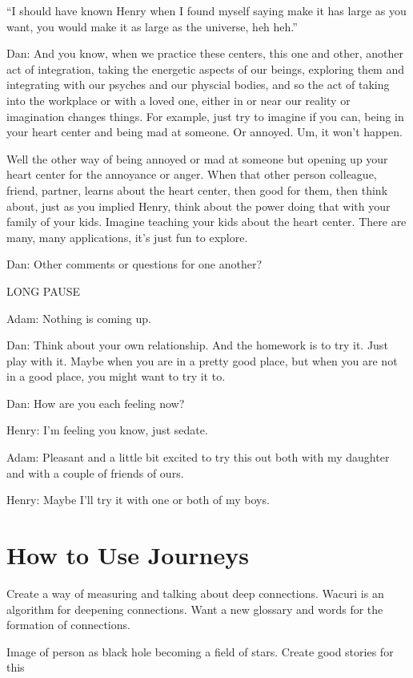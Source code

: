 \documentclass[12pt]{book}
\begin{document}
``I should have known Henry when I found myself saying make it has large as you want,
you would make it as large as the universe, heh heh.''

Dan: And you know, when we practice these centers, this one and other, another act of integration,
taking the energetic aspects of our beings, exploring them and integrating with our psyches and our physcial bodies,
and so the act of taking into the workplace or with a loved one, either in or near our reality or imagination changes things.
For example, just try to imagine if you can, being in your heart center and being mad at someone. Or annoyed. Um, it won't happen.

Well the other way of being annoyed or mad at someone but opening up your heart center for the annoyance or anger.
When that other person colleague, friend, partner, learns about the heart center, then good for them, then think about,
just as you implied Henry, think about the power doing that with your family of your kids. Imagine teaching your
kids about the heart center. There are many, many applications, it's just fun to explore.

Dan: Other comments or questions for one another?

LONG PAUSE

Adam: Nothing is coming up.

Dan: Think about your own relationship. And the homework is to try it. Just play with it. Maybe when you are in a pretty good place,
but when you are not in a good place, you might want to try it to.

Dan: How are you each feeling now?

Henry: I'm feeling you know, just sedate.

Adam: Pleasant and a little bit excited to try this out both with my daughter and with a couple of friends of ours.

Henry: Maybe I'll try it with one or both of my boys.




\chapter{How to Use Journeys}


Create a way of measuring and talking about deep connections. Wacuri
is an algorithm for deepening connections. Want a new glossary and
words for the formation of connections.

Image of person as black hole becoming a field of stars. Create good
stories for this
\end{document}
